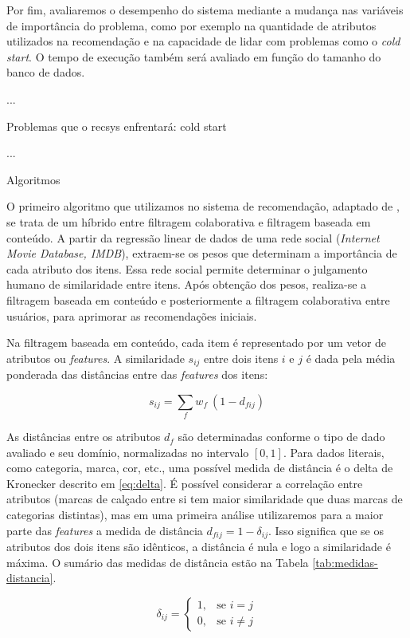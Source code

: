 Por fim, avaliaremos o desempenho do sistema mediante a mudança nas variáveis de importância do problema, como por exemplo na quantidade de atributos utilizados na recomendação e na capacidade de lidar com problemas como o \textit{cold start}. O tempo de execução também será avaliado em função do tamanho do banco de dados.

...

Problemas que o recsys enfrentará: cold start

...

Algoritmos

O primeiro algoritmo que utilizamos no sistema de recomendação, adaptado de  \cite{symeonidis2007feature}, se trata de um híbrido entre filtragem colaborativa e filtragem baseada em conteúdo. A partir da regressão linear de dados de uma rede social (\textit{Internet Movie Database, IMDB}), extraem-se os pesos que determinam a importância de cada atributo dos itens. Essa rede social permite determinar o julgamento humano de similaridade entre itens. Após obtenção dos pesos, realiza-se a filtragem baseada em conteúdo e posteriormente a filtragem colaborativa entre usuários, para aprimorar as recomendações iniciais.

Na filtragem baseada em conteúdo, cada item é representado por um vetor de atributos ou \textit{features}. A similaridade $s_{ij}$ entre dois itens $i$ e $j$ é dada pela média ponderada das distâncias entre das \textit{features} dos itens:

\begin{equation} 
    s_{ij} = \sum_{f}{w_{f} ~ \left(1-d_{fij}\right)}
\end{equation}

As distâncias entre os atributos $d_f$ são determinadas conforme o tipo de dado avaliado e seu domínio, normalizadas no intervalo $\left[0,1\right]$. Para dados literais, como categoria, marca, cor, etc., uma possível medida de distância é o delta de Kronecker descrito em \ref{eq:delta}. É possível considerar a correlação entre atributos (marcas de calçado entre si tem maior similaridade que duas marcas de categorias distintas), mas em uma primeira análise utilizaremos para a maior parte das \textit{features} a medida de distância $d_{fij}=1-\delta_{ij}$. Isso significa que se os atributos dos dois itens são idênticos, a distância é nula e logo a similaridade é máxima. O sumário das medidas de distância estão na Tabela \ref{tab:medidas-distancia}.

\begin{equation}
\label{eq:delta}
\delta_{ij} = 
\begin{cases}
1, &\text{se }i=j \\
0, &\text{se }i \neq j
\end{cases} 
\end{equation}

